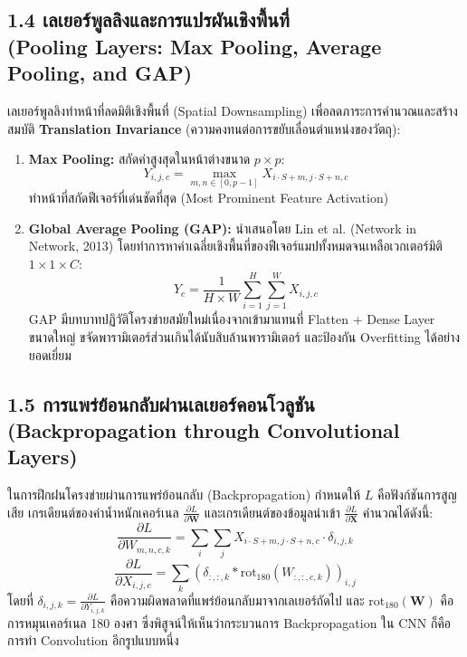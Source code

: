 \documentclass[12pt,a4paper]{article}
\begin{document}
\subsection*{1.4 เลเยอร์พูลลิงและการแปรผันเชิงพื้นที่\\ \normalsize(Pooling Layers: Max Pooling, Average Pooling, and GAP)}
เลเยอร์พูลลิงทำหน้าที่ลดมิติเชิงพื้นที่ (Spatial Downsampling) เพื่อลดภาระการคำนวณและสร้างสมบัติ \textbf{Translation Invariance} (ความคงทนต่อการขยับเลื่อนตำแหน่งของวัตถุ):
\begin{enumerate}[leftmargin=1.8em, itemsep=1pt]
    \item \textbf{Max Pooling:} สกัดค่าสูงสุดในหน้าต่างขนาด $p \times p$:
    \begin{equation}
        Y_{i, j, c} = \max_{m, n \in [0, p-1]} X_{i \cdot S + m, j \cdot S + n, c}
    \end{equation}
    ทำหน้าที่สกัดฟีเจอร์ที่เด่นชัดที่สุด (Most Prominent Feature Activation)
    \item \textbf{Global Average Pooling (GAP):} นำเสนอโดย Lin et al. (Network in Network, 2013) โดยทำการหาค่าเฉลี่ยเชิงพื้นที่ของฟีเจอร์แมปทั้งหมดจนเหลือเวกเตอร์มิติ $1 \times 1 \times C$:
    \begin{equation}
        Y_c = \frac{1}{H \times W} \sum_{i=1}^H \sum_{j=1}^W X_{i, j, c}
    \end{equation}
    GAP มีบทบาทปฏิวัติโครงข่ายสมัยใหม่เนื่องจากเข้ามาแทนที่ Flatten + Dense Layer ขนาดใหญ่ ขจัดพารามิเตอร์ส่วนเกินได้นับสิบล้านพารามิเตอร์ และป้องกัน Overfitting ได้อย่างยอดเยี่ยม
\end{enumerate}

\subsection*{1.5 การแพร่ย้อนกลับผ่านเลเยอร์คอนโวลูชัน\\ \normalsize(Backpropagation through Convolutional Layers)}
ในการฝึกฝนโครงข่ายผ่านการแพร่ย้อนกลับ (Backpropagation) กำหนดให้ $L$ คือฟังก์ชันการสูญเสีย เกรเดียนต์ของค่าน้ำหนักเคอร์เนล $\frac{\partial L}{\partial \mathbf{W}}$ และเกรเดียนต์ของข้อมูลนำเข้า $\frac{\partial L}{\partial \mathbf{X}}$ คำนวณได้ดังนี้:
\begin{equation}
    \frac{\partial L}{\partial W_{m, n, c, k}} = \sum_{i} \sum_{j} X_{i \cdot S + m, j \cdot S + n, c} \cdot \delta_{i, j, k}
\end{equation}
\begin{equation}
    \frac{\partial L}{\partial X_{i, j, c}} = \sum_{k} \left( \delta_{:, :, k} * \text{rot}_{180}(W_{:, :, c, k}) \right)_{i, j}
\end{equation}
โดยที่ $\delta_{i, j, k} = \frac{\partial L}{\partial Y_{i, j, k}}$ คือความผิดพลาดที่แพร่ย้อนกลับมาจากเลเยอร์ถัดไป และ $\text{rot}_{180}(\mathbf{W})$ คือการหมุนเคอร์เนล 180 องศา ซึ่งพิสูจน์ให้เห็นว่ากระบวนการ Backpropagation ใน CNN ก็คือการทำ Convolution อีกรูปแบบหนึ่ง
\end{document}

